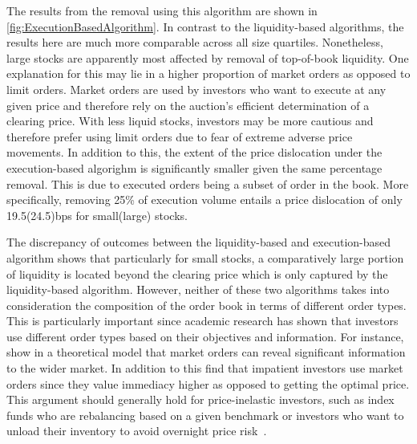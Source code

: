 \documentclass[11pt,a4paper]{article}
\begin{document}
    The results from the removal using this algorithm are shown in \cref{fig:ExecutionBasedAlgorithm}. In contrast to the liquidity-based algorithms, the results here are much more comparable across all size quartiles. Nonetheless, large stocks are apparently most affected by removal of top-of-book liquidity. One explanation for this may lie in a higher proportion of market orders as opposed to limit orders. Market orders are used by investors who want to execute at any given price and therefore rely on the auction's efficient determination of a clearing price. With less liquid stocks, investors may be more cautious and therefore prefer using limit orders due to fear of extreme adverse price movements. In addition to this, the extent of the price dislocation under the execution-based algorighm is significantly smaller given the same percentage removal. This is due to executed orders being a subset of order in the book. More specifically, removing 25\% of execution volume entails a price dislocation of only 19.5(24.5)bps for small(large) stocks.

    The discrepancy of outcomes between the liquidity-based and execution-based algorithm shows that particularly for small stocks, a comparatively large portion of liquidity is located beyond the clearing price which is only captured by the liquidity-based algorithm. However, neither of these two algorithms takes into consideration the composition of the order book in terms of different order types. This is particularly important since academic research has shown that investors use different order types based on their objectives and information. For instance, \textcite{BrownZhang1997} show in a theoretical model that market orders can reveal significant information to the wider market. In addition to this \textcite{Rosu2009,GoettlerParlourRajan2005} find that impatient investors use market orders since they value immediacy higher as opposed to getting the optimal price. This argument should generally hold for price-inelastic investors, such as index funds who are rebalancing based on a given benchmark or investors who want to unload their inventory to avoid overnight price risk~\parencite{CarteaJaimungal2015}.
\end{document}
